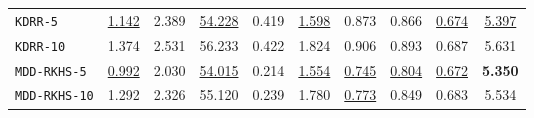 \documentclass{article}
\begin{document}
\begin{table*}[t]
\begin{tabular*}{\linewidth}{@{\extracolsep{-0.06cm}}lccccccccc}
\texttt{KDRR-5}                          &\underline{1.142}                    &2.389                   &\underline{54.228}  &0.419              &\underline{1.598}              &0.873                &0.866                  &\underline{0.674}                      &\underline{5.397}\\
\texttt{KDRR-10}                         &1.374                    &2.531                   &56.233              &0.422              &1.824              &0.906                &0.893                  &0.687                      &5.631\\
\texttt{MDD-RKHS-5}                      &\underline{0.992}        &2.030                   &\underline{54.015}  &0.214              &\underline{1.554}  &\underline{0.745}                &\underline{0.804}      &\underline{0.672}          &\textbf{5.350}\\
\texttt{MDD-RKHS-10}                     &1.292                    &2.326                   &55.120              &0.239              &1.780              &\underline{0.773}                &0.849                  &0.683                      &5.534\\

   \bottomrule
\end{tabular*}
\end{table*}
\end{document}
